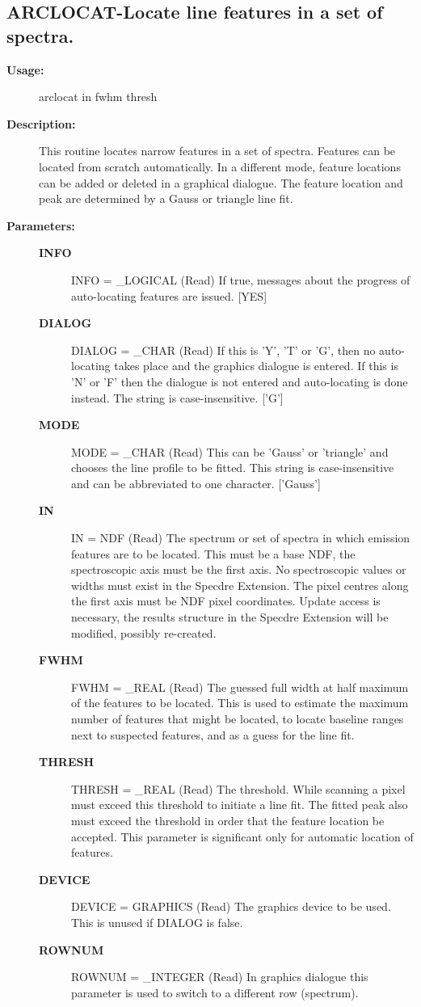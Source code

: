 \subsection{ARCLOCAT-\label{ARCLOCAT}Locate line features in a set of spectra.}
\begin{description}

\item [{\bf Usage:}]

   arclocat in fwhm thresh


\item [{\bf Description:}]
   This routine locates narrow features in a set of spectra. Features
   can be located from scratch automatically. In a different mode,
   feature locations can be added or deleted in a graphical dialogue.
   The feature location and peak are determined by a Gauss or
   triangle line fit.


\item [{\bf Parameters:}]
\begin{description}
\item [{\bf INFO}]
INFO = _LOGICAL (Read)
   If true, messages about the progress of auto-locating features
   are issued. [YES]
\item [{\bf DIALOG}]
DIALOG = _CHAR (Read)
   If this is 'Y', 'T' or 'G', then no auto-locating takes place
   and the graphics dialogue is entered. If this is 'N' or 'F'
   then the dialogue is not entered and auto-locating is done
   instead. The string is case-insensitive.  ['G']
\item [{\bf MODE}]
MODE = _CHAR (Read)
   This can be 'Gauss' or 'triangle' and chooses the line profile
   to be fitted. This string is case-insensitive and can be
   abbreviated to one character. ['Gauss']
\item [{\bf IN}]
IN = NDF (Read)
   The spectrum or set of spectra in which emission features are
   to be located. This must be a base NDF, the spectroscopic axis
   must be the first axis. No spectroscopic values or widths must
   exist in the Specdre Extension. The pixel centres along the
   first axis must be NDF pixel coordinates. Update access is
   necessary, the results structure in the Specdre Extension will
   be modified, possibly re-created.
\item [{\bf FWHM}]
FWHM = _REAL (Read)
   The guessed full width at half maximum of the features to be
   located. This is used to estimate the maximum number of
   features that might be located, to locate baseline ranges next
   to suspected features, and as a guess for the line fit.
\item [{\bf THRESH}]
THRESH = _REAL (Read)
   The threshold. While scanning a pixel must exceed this
   threshold to initiate a line fit. The fitted peak also must
   exceed the threshold in order that the feature location be
   accepted. This parameter is significant only for automatic
   location of features.
\item [{\bf DEVICE}]
DEVICE = GRAPHICS (Read)
   The graphics device to be used. This is unused if DIALOG is
   false.
\item [{\bf ROWNUM}]
ROWNUM = _INTEGER (Read)
   In graphics dialogue this parameter is used to switch to a
   different row (spectrum).


\end{description}
\end{description}
